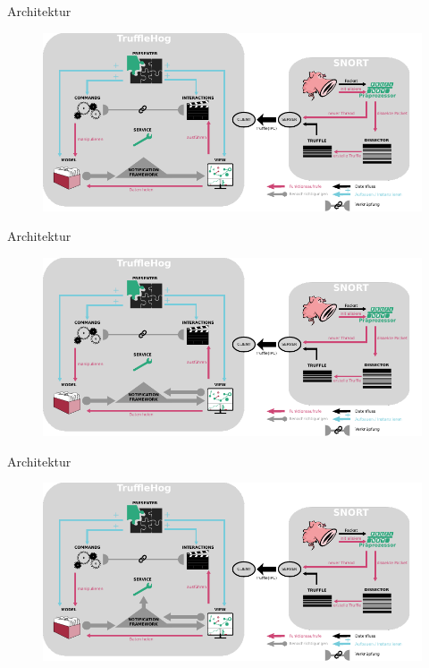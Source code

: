 \documentclass[18pt]{beamer}
\begin{document}
\begin{frame}{Architektur}
    \begin{figure}
    	\centering
    	\includegraphics[width=\textwidth]{./images/18.pdf}
    \end{figure}
\end{frame}

\begin{frame}{Architektur}
    \begin{figure}
    	\centering
    	\includegraphics[width=\textwidth]{./images/19.pdf}
    \end{figure}
\end{frame}

\begin{frame}{Architektur}
    \begin{figure}
    	\centering
    	\includegraphics[width=\textwidth]{./images/20.pdf}
    \end{figure}
\end{frame}
\end{document}
